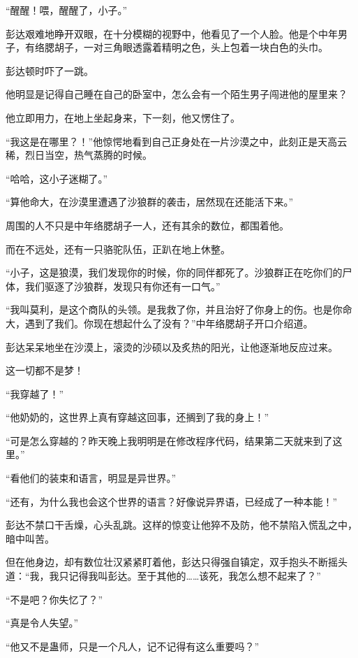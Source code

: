 
\begin{this_body}

“醒醒！喂，醒醒了，小子。”

彭达艰难地睁开双眼，在十分模糊的视野中，他看见了一个人脸。他是个中年男子，有络腮胡子，一对三角眼透露着精明之色，头上包着一块白色的头巾。

彭达顿时吓了一跳。

他明显是记得自己睡在自己的卧室中，怎么会有一个陌生男子闯进他的屋里来？

他立即用力，在地上坐起身来，下一刻，他又愣住了。

“我这是在哪里？！”他惊愕地看到自己正身处在一片沙漠之中，此刻正是天高云稀，烈日当空，热气蒸腾的时候。

“哈哈，这小子迷糊了。”

“算他命大，在沙漠里遭遇了沙狼群的袭击，居然现在还能活下来。”

周围的人不只是中年络腮胡子一人，还有其余的数位，都围着他。

而在不远处，还有一只骆驼队伍，正趴在地上休整。

“小子，这是狼漠，我们发现你的时候，你的同伴都死了。沙狼群正在吃你们的尸体，我们驱逐了沙狼群，发现只有你还有一口气。”

“我叫莫利，是这个商队的头领。是我救了你，并且治好了你身上的伤。也是你命大，遇到了我们。你现在想起什么了没有？”中年络腮胡子开口介绍道。

彭达呆呆地坐在沙漠上，滚烫的沙硕以及炙热的阳光，让他逐渐地反应过来。

这一切都不是梦！

“我穿越了！”

“他奶奶的，这世界上真有穿越这回事，还搁到了我的身上！”

“可是怎么穿越的？昨天晚上我明明是在修改程序代码，结果第二天就来到了这里。”

“看他们的装束和语言，明显是异世界。”

“还有，为什么我也会这个世界的语言？好像说异界语，已经成了一种本能！”

彭达不禁口干舌燥，心头乱跳。这样的惊变让他猝不及防，他不禁陷入慌乱之中，暗中叫苦。

但在他身边，却有数位壮汉紧紧盯着他，彭达只得强自镇定，双手抱头不断摇头道：“我，我只记得我叫彭达。至于其他的……该死，我怎么想不起来了？”

“不是吧？你失忆了？”

“真是令人失望。”

“他又不是蛊师，只是一个凡人，记不记得有这么重要吗？”


\end{this_body}
